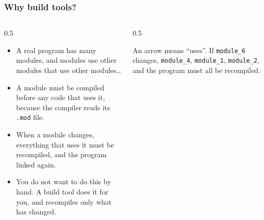 \begin{frame}[fragile]
  \frametitle{Why build tools?}
  \begin{columns}[T]
    \begin{column}{0.5\textwidth}
      \begin{itemize}
        \item A real program has many modules, and modules use other modules that use other modules\ldots
        \item A module must be compiled before any code that uses it, because the compiler reads its \texttt{.mod} file.
        \item When a module changes, everything that uses it must be recompiled, and the program linked again.
        \item You do not want to do this by hand. A build tool does it for you, and recompiles only what has changed.
      \end{itemize}
    \end{column}

    \begin{column}{0.5\textwidth}
      \centering

      \vspace*{1mm}
      {\scriptsize An arrow means ``uses''. If \texttt{module\_6} changes, \texttt{module\_4}, \texttt{module\_1}, \texttt{module\_2}, and the program must all be recompiled.}
    \end{column}
  \end{columns}
\end{frame}


